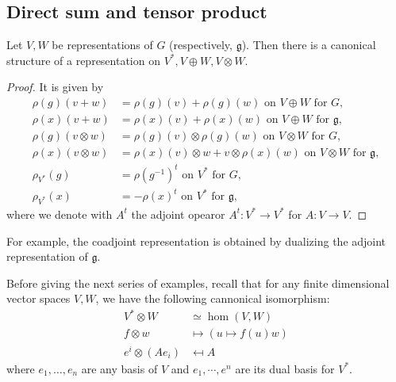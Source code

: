 \documentclass{report}
\begin{document}
\subsection{Direct sum and tensor product}
\begin{lemma}\label{lem:direct_sum_tensor_product}
    Let $V , W$ be representations of $G$ (respectively, $\mathfrak g$). 
    Then there is a canonical structure of a representation on $V^*, V \oplus W, V \otimes W$.
\end{lemma}
\begin{proof}
    It is given by
    \begin{align*}
        \rho(g)(v + w) &= \rho(g)(v) + \rho(g)(w) \text{ on } V \oplus W \text{ for } G,\\
        \rho(x)(v + w) &= \rho(x)(v) + \rho(x)(w) \text{ on } V \oplus W \text{ for } \mathfrak g,\\
        \rho(g)(v \otimes w) &= \rho(g)(v) \otimes \rho(g)(w) \text{ on } V \otimes W \text{ for } G,\\
        \rho(x)(v \otimes w) &= \rho(x)(v) \otimes w + v \otimes \rho(x)(w) \text{ on } V \otimes W \text{ for } \mathfrak g,\\
        \rho_{V^*}(g) &= \rho(g^{-1})^t \text{ on } V^* \text{ for } G,\\
        \rho_{V^*}(x) &= -\rho(x)^t \text{ on } V^* \text{ for } \mathfrak g,
    \end{align*}
    where we denote with $A^t$ the adjoint opearor $A^t:V^* \to V^*$ for $A: V \to V$.
\end{proof}
For example, the coadjoint representation is obtained by dualizing the adjoint representation of $\mathfrak g$.

Before giving the next series of examples, recall that for any finite dimensional vector spaces $V, W$, we have the following cannonical isomorphism:
\begin{align*}
    V^* \otimes W &\simeq \hom(V, W)\\
    f \otimes w &\mapsto \left( u \mapsto f(u)w \right)\\
    e^i \otimes (Ae_i) &\mapsfrom A
\end{align*}
where $e_1, \ldots, e_n$ are any basis of $V$ and $e_1, \cdots, e^n$ are its dual basis for $V^*$.
\end{document}
